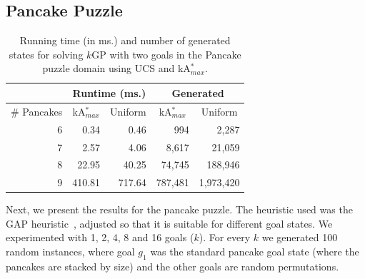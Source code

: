 \documentclass{aicom2e}
\newcommand{\kgs}{$k$GP}
\newcommand{\kastar}{kA$^*$}
\newcommand{\kastarmax}{kA$^*_{max}$}
\newcommand{\kxastar}{k$\times$A$^*$}
\newcommand{\roni}[1]{\textbf{[RS:#1]}}
\begin{document}


\subsection{Pancake Puzzle}

\begin{table}[]
    \centering
    \begin{tabular}{|r|r|r|r|r|}
    \hline
        \multicolumn{1}{|l|}{}            & \multicolumn{2}{c|}{Runtime (ms.)}                                       & \multicolumn{2}{c|}{Generated} \\ \hline
        \multicolumn{1}{|c|}{\# Pancakes} & \multicolumn{1}{c}{\kastarmax{}} & \multicolumn{1}{c|}{Uniform} & \multicolumn{1}{c}{\kastarmax{}} & \multicolumn{1}{c|}{Uniform} \\ \hline
        6                               & 0.34                                      & 0.46                        & 994                                       & 2,287                       \\
        7                               & 2.57                                      & 4.06                        & 8,617                                     & 21,059                      \\
        8                               & 22.95                                     & 40.25                       & 74,745                                    & 188,946                     \\
        9                               & 410.81                                    & 717.64                      & 787,481                                   &
        1,973,420\\
        \hline
    \end{tabular}
    \caption{Running time (in ms.) and number of generated states for solving \kgs{} with two goals
        in the Pancake puzzle domain using UCS and \kastarmax{}.}
\label{tab:pancake-max-uniform}
\end{table}

Next, we present the results for the pancake puzzle. The heuristic used was the GAP heuristic~\cite{helmert2010landmark}, adjusted so that it is suitable for different goal states. 
We experimented with 1, 2, 4, 8 and 16 goals ($k$). For every $k$ we generated 100 random instances, where goal $g_1$ was the standard pancake goal state (where the pancakes are stacked by size) and the other goals are random permutations. 
\end{document}
